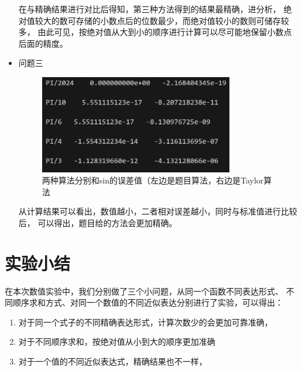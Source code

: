 \documentclass[10pt,a4paper,oneside]{article}
\begin{document}
\begin{itemize}
  在与精确结果进行对比后得知，第三种方法得到的结果最精确，进分析，
绝对值较大的数可存储的小数点后的位数最少，而绝对值较小的数则可储存较多，
由此可见，按绝对值从大到小的顺序进行计算可以尽可能地保留小数点后面的精度。
  \item 问题三
  \begin{figure}[H]
    \centering
    \includegraphics[width=0.8\textwidth]{屏幕截图 2024-09-07 133244.png}
    \caption{两种算法分别和sin的误差值（左边是题目算法，右边是Taylor算法}
  \end{figure}
  从计算结果可以看出，数值越小，二者相对误差越小，同时与标准值进行比较后，
  可以得出，题目给的方法会更加精确。
\end{itemize}


\section{实验小结}

在本次数值实验中，我们分别做了三个小问题，从同一个函数不同表达形式、
不同顺序求和方式、对同一个数值的不同近似表达分别进行了实验，可以得出：

\begin{enumerate}
  \item 对于同一个式子的不同精确表达形式，计算次数少的会更加可靠准确，
  \item 对于不同顺序求和，按绝对值从小到大的顺序更加准确
  \item 对于一个值的不同近似表达式，精确结果也不一样，
\end{enumerate}
\end{document}
